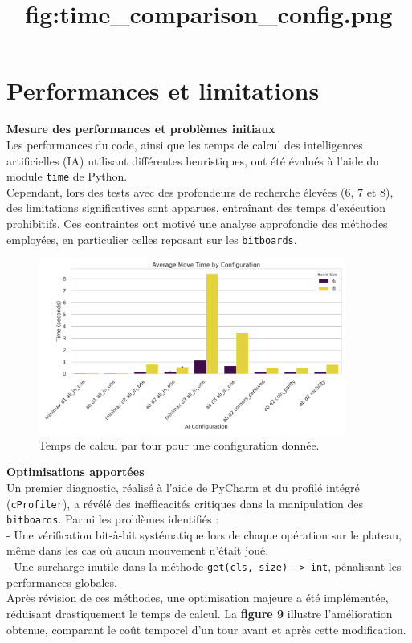\documentclass[a4paper,12pt]{article}
\begin{document}
\newpage

\section{Performances et limitations}

\textbf{Mesure des performances et problèmes initiaux}\\

Les performances du code, ainsi que les temps de calcul des intelligences
artificielles (IA) utilisant différentes heuristiques, ont été évalués à l’aide
du module \texttt{time} de Python.\\ Cependant, lors des tests avec des
profondeurs de recherche élevées (6, 7 et 8), des limitations significatives
sont apparues, entraînant des temps d’exécution prohibitifs. Ces contraintes
ont motivé une analyse approfondie des méthodes employées, en particulier
celles reposant sur les \texttt{bitboards}.\\

\begin{figure}[h]

    \centering
    \includegraphics[width=0.9\textwidth]{images/time_comparison_config.png}
    \caption{Temps de calcul par tour pour une configuration donnée.}
    \title{fig:time_comparison_config.png}

\end{figure}

\textbf{Optimisations apportées}\\

Un premier diagnostic, réalisé à l’aide de PyCharm et du profilé intégré
(\texttt{cProfiler}), a révélé des inefficacités critiques dans la manipulation
des \texttt{bitboards}. Parmi les problèmes identifiés :\\ - Une vérification
bit-à-bit systématique lors de chaque opération sur le plateau, même dans les
cas où aucun mouvement n’était joué.\\ - Une surcharge inutile dans la méthode
\texttt{get(cls, size) -> int}, pénalisant les performances globales.\\ Après
révision de ces méthodes, une optimisation majeure a été implémentée, réduisant
drastiquement le temps de calcul. La \textbf{figure 9} illustre l’amélioration
obtenue, comparant le coût temporel d’un tour avant et après cette
modification.\\
\end{document}

